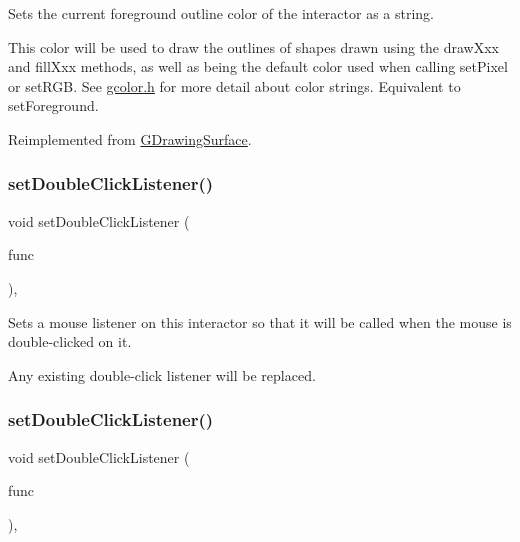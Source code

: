 Sets the current foreground outline color of the interactor as a string. 

This color will be used to draw the outlines of shapes drawn using the draw\+Xxx and fill\+Xxx methods, as well as being the default color used when calling set\+Pixel or set\+R\+GB. See \mbox{\hyperlink{gcolor_8h_source}{gcolor.\+h}} for more detail about color strings. Equivalent to set\+Foreground. 

Reimplemented from \mbox{\hyperlink{classsgl_1_1GDrawingSurface_a61374df6c11b52cfbb0815decdbaebc6}{G\+Drawing\+Surface}}.

\mbox{\label{classsgl_1_1GInteractor_ac29f9a3462458e165fae3a1f046ee77a}} 
\subsubsection{\texorpdfstring{set\+Double\+Click\+Listener()}{setDoubleClickListener()}\hspace{0.1cm}{\footnotesize\ttfamily [1/2]}}
{\footnotesize\ttfamily void set\+Double\+Click\+Listener (\begin{DoxyParamCaption}\item[{\mbox{\hyperlink{namespacesgl_ae9f3e9eab70035da1a2b114e21357b25}{G\+Event\+Listener}}}]{func }\end{DoxyParamCaption})\hspace{0.3cm}{\ttfamily [virtual]}, {\ttfamily [inherited]}}



Sets a mouse listener on this interactor so that it will be called when the mouse is double-\/clicked on it. 

Any existing double-\/click listener will be replaced. \mbox{\label{classsgl_1_1GInteractor_a50096194d66f48c92dd4c512d41bfc76}} 
\subsubsection{\texorpdfstring{set\+Double\+Click\+Listener()}{setDoubleClickListener()}\hspace{0.1cm}{\footnotesize\ttfamily [2/2]}}
{\footnotesize\ttfamily void set\+Double\+Click\+Listener (\begin{DoxyParamCaption}\item[{\mbox{\hyperlink{namespacesgl_a54427ce97bb1c2804e4fe2b0a62e8b17}{G\+Event\+Listener\+Void}}}]{func }\end{DoxyParamCaption})\hspace{0.3cm}{\ttfamily [virtual]}, {\ttfamily [inherited]}}




